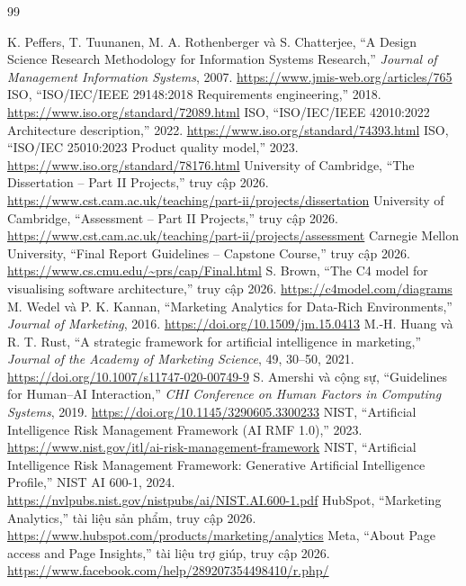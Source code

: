 \begin{thebibliography}{99}
 K. Peffers, T. Tuunanen, M. A. Rothenberger và S. Chatterjee, ``A Design Science Research Methodology for Information Systems Research,'' \textit{Journal of Management Information Systems}, 2007. \url{https://www.jmis-web.org/articles/765}
 ISO, ``ISO/IEC/IEEE 29148:2018 Requirements engineering,'' 2018. \url{https://www.iso.org/standard/72089.html}
 ISO, ``ISO/IEC/IEEE 42010:2022 Architecture description,'' 2022. \url{https://www.iso.org/standard/74393.html}
 ISO, ``ISO/IEC 25010:2023 Product quality model,'' 2023. \url{https://www.iso.org/standard/78176.html}
 University of Cambridge, ``The Dissertation -- Part II Projects,'' truy cập 2026. \url{https://www.cst.cam.ac.uk/teaching/part-ii/projects/dissertation}
 University of Cambridge, ``Assessment -- Part II Projects,'' truy cập 2026. \url{https://www.cst.cam.ac.uk/teaching/part-ii/projects/assessment}
 Carnegie Mellon University, ``Final Report Guidelines -- Capstone Course,'' truy cập 2026. \url{https://www.cs.cmu.edu/~prs/cap/Final.html}
 S. Brown, ``The C4 model for visualising software architecture,'' truy cập 2026. \url{https://c4model.com/diagrams}
 M. Wedel và P. K. Kannan, ``Marketing Analytics for Data-Rich Environments,'' \textit{Journal of Marketing}, 2016. \url{https://doi.org/10.1509/jm.15.0413}
 M.-H. Huang và R. T. Rust, ``A strategic framework for artificial intelligence in marketing,'' \textit{Journal of the Academy of Marketing Science}, 49, 30--50, 2021. \url{https://doi.org/10.1007/s11747-020-00749-9}
 S. Amershi và cộng sự, ``Guidelines for Human--AI Interaction,'' \textit{CHI Conference on Human Factors in Computing Systems}, 2019. \url{https://doi.org/10.1145/3290605.3300233}
 NIST, ``Artificial Intelligence Risk Management Framework (AI RMF 1.0),'' 2023. \url{https://www.nist.gov/itl/ai-risk-management-framework}
 NIST, ``Artificial Intelligence Risk Management Framework: Generative Artificial Intelligence Profile,'' NIST AI 600-1, 2024. \url{https://nvlpubs.nist.gov/nistpubs/ai/NIST.AI.600-1.pdf}
 HubSpot, ``Marketing Analytics,'' tài liệu sản phẩm, truy cập 2026. \url{https://www.hubspot.com/products/marketing/analytics}
 Meta, ``About Page access and Page Insights,'' tài liệu trợ giúp, truy cập 2026. \url{https://www.facebook.com/help/289207354498410/r.php/}
\end{thebibliography}

